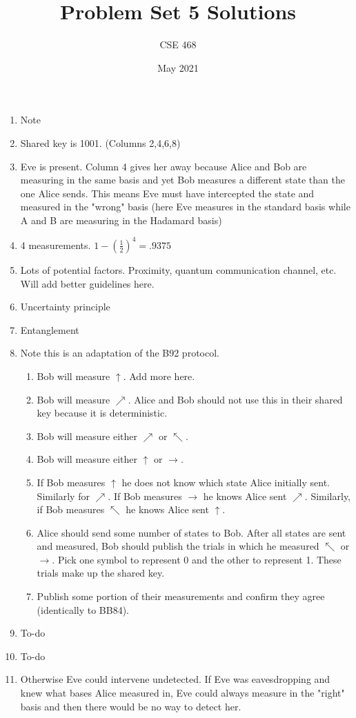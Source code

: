 \documentclass[12pt]{article}
\title{Problem Set 5 Solutions}
\author{CSE 468}
\date{May 2021}
\begin{document}
\maketitle

\begin{enumerate}[font=\bfseries]
    \item Note
    \item Shared key is 1001. (Columns 2,4,6,8)
    \item Eve is present. Column 4 gives her away because Alice and Bob are measuring in the same basis and yet Bob measures a different state than the one Alice sends. This means Eve must have intercepted the state and measured in the "wrong" basis (here Eve measures in the standard basis while A and B are measuring in the Hadamard basis)
    \item 4 measurements. $1 - (\frac{1}{2})^4 = .9375$
    \item Lots of potential factors. Proximity, quantum communication channel, etc. Will add better guidelines here.
    \item Uncertainty principle
    \item Entanglement
    \item Note this is an adaptation of the B92 protocol.
        \begin{enumerate}
            \item Bob will measure $\uparrow$. Add more here.
            \item Bob will measure $\nearrow$. Alice and Bob should not use this in their shared key because it is deterministic.
            \item Bob will measure either $\nearrow$ or $\nwarrow$.
            \item Bob will measure either $\uparrow$ or $\rightarrow$.
            \item If Bob measures $\uparrow$ he does not know which state Alice initially sent. Similarly for $\nearrow$. If Bob measures $\rightarrow$ he knows Alice sent $\nearrow$. Similarly, if Bob measures $\nwarrow$ he knows Alice sent $\uparrow$.
            \item Alice should send some number of states to Bob.  After all states are sent and measured, Bob should publish the trials in which he measured $\nwarrow$ or $\rightarrow$. Pick one symbol to represent 0 and the other to represent 1. These trials make up the shared key.
            \item Publish some portion of their measurements and confirm they agree (identically to BB84). 
        \end{enumerate}
    \item To-do
    \item To-do
    \item Otherwise Eve could intervene undetected. If Eve was eavesdropping and knew what bases Alice measured in, Eve could always measure in the "right" basis and then there would be no way to detect her.
\end{enumerate}
\end{document}
